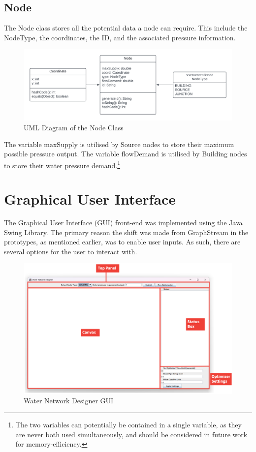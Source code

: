 \subsection{Node}
The Node class stores all the potential data a node can require. This include the NodeType, the coordinates, the ID, and the associated pressure information.
\begin{figure}[H]
    \centering
    \includegraphics[width=1\linewidth]{Blank diagram (1).png}
    \caption{UML Diagram of the Node Class}
    \label{fig:node_uml}
\end{figure}
The variable $\text{maxSupply}$ is utilised by Source nodes to store their maximum possible pressure output. The variable $\text{flowDemand}$ is utilised by Building nodes to store their water pressure demand.\footnote{The two variables can potentially be contained in a single variable, as they are never both used simultaneously, and should be considered in future work for memory-efficiency.}

\section{Graphical User Interface}\label{gui}
The Graphical User Interface (GUI) front-end was implemented using the Java Swing Library. The primary reason the shift was made from GraphStream in the prototypes, as mentioned earlier, was to enable user inputs. As such, there are several options for the user to interact with.

\begin{figure}[H]
    \centering
    \includegraphics[width=1.0\linewidth]{guimarkup.png}
    \caption{Water Network Designer GUI}
    \label{fig:guimarkup}
\end{figure}


